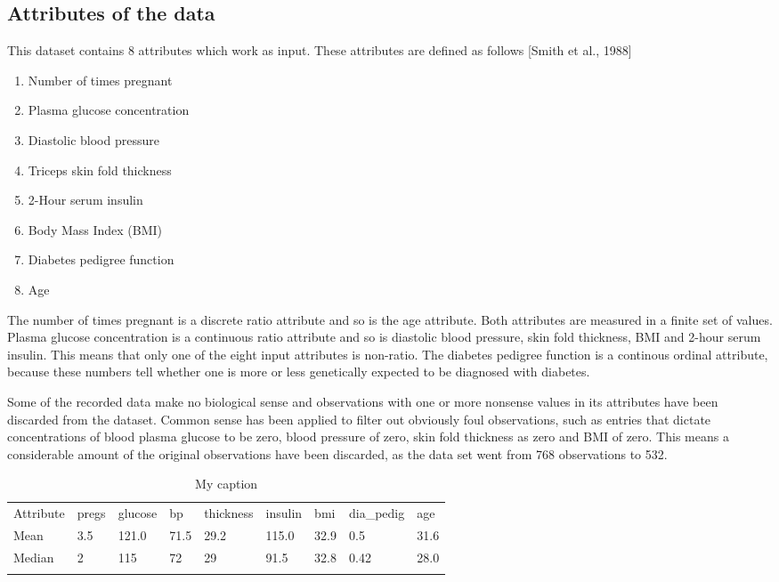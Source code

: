 \subsection{Attributes of the data}
This dataset contains 8 attributes which work as input. These attributes are defined as follows
[Smith et al., 1988]
\begin{enumerate}
\item Number of times pregnant
\item Plasma glucose concentration
\item Diastolic blood pressure
\item Triceps skin fold thickness
\item 2-Hour serum insulin
\item Body Mass Index (BMI)
\item Diabetes pedigree function
\item Age
\end{enumerate}

The number of times pregnant is a discrete ratio attribute and so is
the age attribute. Both attributes are measured in a finite set of values.
Plasma glucose concentration is a continuous ratio attribute
and so is diastolic blood pressure, skin fold thickness, BMI and 2-hour serum
insulin. This means that only one of the eight input attributes is non-ratio.
The diabetes pedigree function is a continous ordinal attribute, because these
numbers tell whether one is more or less genetically expected to be diagnosed
with diabetes.
\bigskip

Some of the recorded data make no biological sense and observations with one or
more nonsense values in its attributes have been discarded from the dataset.
Common sense has been applied to filter out obviously foul observations, such
as entries that dictate concentrations of blood plasma glucose to be zero, blood
pressure of zero, skin fold thickness as zero and BMI of zero. This means a
considerable amount of the original observations have been discarded, as the
data set went from 768 observations to 532.
\bigskip

\begin{table}[]
\centering
\caption{My caption}
\label{my-label}
\begin{tabular}{lllllllll}
\cline{1-1}
\multicolumn{1}{|l|}{Attribute} & pregs & glucose & bp   & thickness & insulin & bmi  & dia\_pedig & age  \\ \cline{1-1}
\multicolumn{1}{|l|}{Mean}      & 3.5   & 121.0   & 71.5 & 29.2      & 115.0   & 32.9 & 0.5        & 31.6 \\ \cline{1-1}
\multicolumn{1}{|l|}{Median}    & 2     & 115     & 72   & 29        & 91.5    & 32.8 & 0.42       & 28.0 \\ \cline{1-1}
                                                       &       &         &      &           &         &      &            &      \\ \hline
\end{tabular}
\end{table}
